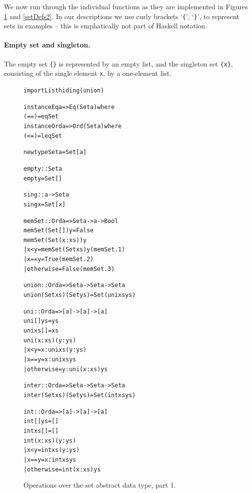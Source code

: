 We now run through the individual functions as they are implemented in Figures
\ref{setDefs1} and \ref{setDefs2}. In our descriptions we use
curly brackets `\texttt{\{}', `\texttt{\}}', to
represent sets in examples -- this is emphatically not part of Haskell notation.

\paragraph{Empty set and singleton.}
The empty set \texttt{\{\}} is represented by an empty list, and the singleton 
set \texttt{\{x\}},
consisting of the single element \texttt{x}, by a one-element list.
\begin{figure}
\begin{alltt}
import List hiding ( union )

instance Eq a => Eq (Set a) where
  (==) = eqSet
instance Ord a => Ord (Set a) where
  (<=) = leqSet

newtype Set a = Set [a]

empty :: Set a
empty  = Set []

sing :: a -> Set a
sing x = Set [x]

memSet :: Ord a => Set a -> a -> Bool
memSet (Set []) y     = False
memSet (Set (x:xs)) y 
  | x<y         = memSet (Set xs) y\hfill(memSet.1)
  | x==y        = True\hfill(memSet.2)
  | otherwise   = False\hfill(memSet.3)

union :: Ord a => Set a -> Set a -> Set a
union (Set xs) (Set ys) = Set (uni xs ys)

uni :: Ord a => [a] -> [a] -> [a]
uni [] ys       = ys
uni xs []       = xs
uni (x:xs) (y:ys) 
  | x<y         = x : uni xs (y:ys)
  | x==y        = x : uni xs ys
  | otherwise   = y : uni (x:xs) ys

inter :: Ord a => Set a -> Set a -> Set a
inter (Set xs) (Set ys) = Set (int xs ys)

int :: Ord a => [a] -> [a] -> [a]
int [] ys       = []
int xs []       = []
int (x:xs) (y:ys) 
  | x<y         = int xs (y:ys)
  | x==y        = x : int xs ys
  | otherwise   = int (x:xs) ys
\end{alltt}
\caption{Operations over the set abstract data type, part 1.}
\label{setDefs1}
\end{figure}

